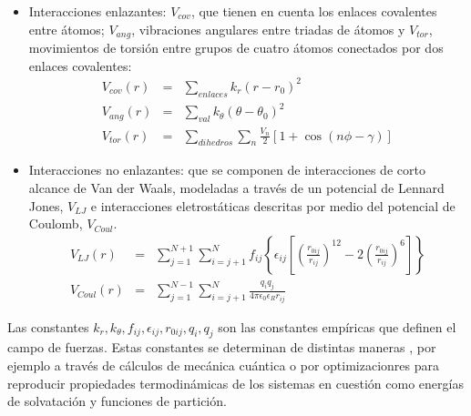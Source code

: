 \begin{itemize}
\item Interacciones enlazantes: $V_{cov}$, que tienen en cuenta los enlaces covalentes entre \'{a}tomos; $V_{ang}$, vibraciones angulares entre triadas de \'{a}tomos y $V_{tor}$, movimientos de torsi\'{o}n entre grupos de cuatro \'{a}tomos conectados por dos enlaces covalentes:
\begin{eqnarray}\label{eq:6}
V_{cov}(r)&=&\sum_{enlaces}k_r\left(r-r_0\right)^2\\
V_{ang}(r)&=&\sum_{val}k_\theta\left(\theta-\theta_{0}\right)^2\\
V_{tor}(r)&=&\sum_{dihedros}\sum_{n}\frac{V_n}{2}\left[1+\cos(n\phi-\gamma)\right]
\end{eqnarray}
\item Interacciones no enlazantes: que se componen de interacciones de corto alcance de Van der Waals, modeladas a trav\'{e}s de un potencial de Lennard Jones, $V_{LJ}$ e interacciones eletrost\'{a}ticas descritas por medio del potencial de Coulomb, $V_{Coul}$.
\begin{eqnarray}\label{eq:7}
V_{LJ}(r)&=&\sum_{j=1}^{N+1}\sum_{i=j+1}^N f_{ij}\left\{\epsilon_{ij}\left[\left(\frac{r_{0ij}}{r_{ij}}\right)^{12}-2\left(\frac{r_{0ij}}{r_{ij}}\right)^6\right]\right\}\\
V_{Coul}(r)&=&\sum_{j=1}^{N-1}\sum_{i=j+1}^{N}\frac{q_iq_j}{4\pi\epsilon_0\epsilon_R r_{ij}}
\end{eqnarray}
\end{itemize}
Las constantes $k_r,k_\theta,f_{ij},\epsilon_{ij},r_{0ij},q_{i},q_{j}$ son las constantes emp\'{i}ricas que definen el campo de fuerzas. Estas constantes se determinan de distintas maneras , por ejemplo a trav\'{e}s de c\'{a}lculos de mec\'{a}nica cu\'{a}ntica o por optimizacionres para reproducir propiedades termodin\'{a}micas de los sistemas en cuesti\'{o}n como energ\'{i}as de solvataci\'{o}n y funciones de partici\'{o}n.


